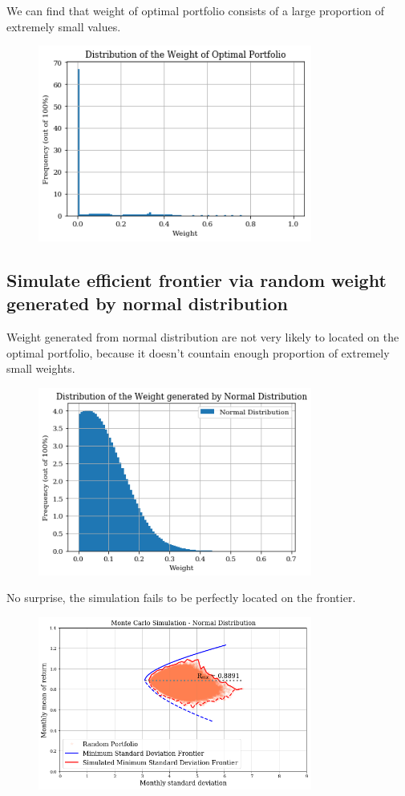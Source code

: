 \documentclass{article}
\begin{document}
We can find that weight of optimal portfolio consists of a large proportion of extremely small values.
\begin{figure}[h]
	\centering
	\includegraphics[width=9cm]{output_27_0.png}
\end{figure}

\subsection{Simulate efficient frontier via random weight generated by normal distribution}

Weight generated from normal distribution are not very likely to located on the optimal portfolio, because it doesn't countain enough proportion of extremely small weights.
\begin{figure}[h]
	\centering
	\includegraphics[width=9cm]{output_31_0.png}
\end{figure}

No surprise, the simulation fails to be perfectly located on the frontier.
\begin{figure}[h]
	\centering
	\includegraphics[width=9cm]{output_35_0.png}
\end{figure}
\end{document}
